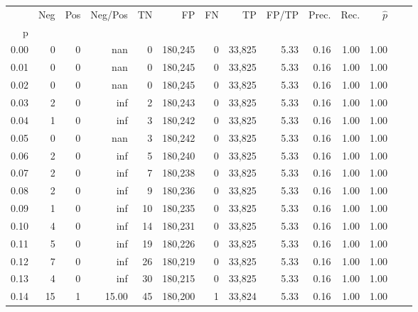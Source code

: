 \begin{tabular}{rrrrrrrrrrrrrr}
\toprule
{} &    Neg &    Pos & Neg/Pos &       TN &       FP &      FN &      TP & FP/TP & Prec. &  Rec. & $\hat{p}$ \\
p    &        &        &         &          &          &         &         &       &       &       &           \\
\midrule
0.00 &      0 &      0 &     nan &        0 &  180,245 &       0 &  33,825 &  5.33 &  0.16 &  1.00 &      1.00 \\
0.01 &      0 &      0 &     nan &        0 &  180,245 &       0 &  33,825 &  5.33 &  0.16 &  1.00 &      1.00 \\
0.02 &      0 &      0 &     nan &        0 &  180,245 &       0 &  33,825 &  5.33 &  0.16 &  1.00 &      1.00 \\
0.03 &      2 &      0 &     inf &        2 &  180,243 &       0 &  33,825 &  5.33 &  0.16 &  1.00 &      1.00 \\
0.04 &      1 &      0 &     inf &        3 &  180,242 &       0 &  33,825 &  5.33 &  0.16 &  1.00 &      1.00 \\
0.05 &      0 &      0 &     nan &        3 &  180,242 &       0 &  33,825 &  5.33 &  0.16 &  1.00 &      1.00 \\
0.06 &      2 &      0 &     inf &        5 &  180,240 &       0 &  33,825 &  5.33 &  0.16 &  1.00 &      1.00 \\
0.07 &      2 &      0 &     inf &        7 &  180,238 &       0 &  33,825 &  5.33 &  0.16 &  1.00 &      1.00 \\
0.08 &      2 &      0 &     inf &        9 &  180,236 &       0 &  33,825 &  5.33 &  0.16 &  1.00 &      1.00 \\
0.09 &      1 &      0 &     inf &       10 &  180,235 &       0 &  33,825 &  5.33 &  0.16 &  1.00 &      1.00 \\
0.10 &      4 &      0 &     inf &       14 &  180,231 &       0 &  33,825 &  5.33 &  0.16 &  1.00 &      1.00 \\
0.11 &      5 &      0 &     inf &       19 &  180,226 &       0 &  33,825 &  5.33 &  0.16 &  1.00 &      1.00 \\
0.12 &      7 &      0 &     inf &       26 &  180,219 &       0 &  33,825 &  5.33 &  0.16 &  1.00 &      1.00 \\
0.13 &      4 &      0 &     inf &       30 &  180,215 &       0 &  33,825 &  5.33 &  0.16 &  1.00 &      1.00 \\
0.14 &     15 &      1 &   15.00 &       45 &  180,200 &       1 &  33,824 &  5.33 &  0.16 &  1.00 &      1.00 \\

\end{tabular}

